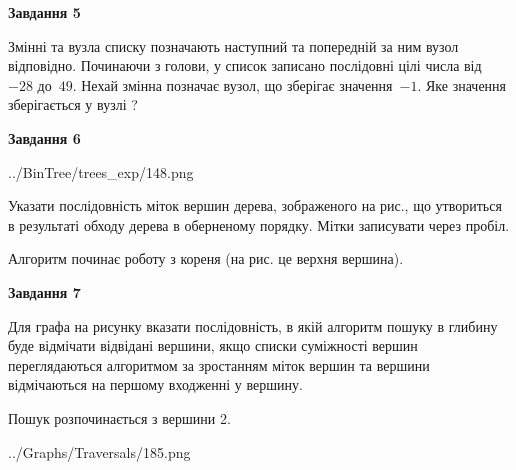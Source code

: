 \documentclass[12pt, ukrainian]{article}
\begin{document}
{\begin {large}
{\begin {center}\textbf{Завдання 5}\end {center}}\par
Змінні  та  вузла списку позначають наступний та попередній за ним вузол відповідно. Починаючи з голови, у список записано послідовні цілі числа від~$-28$ до~$49$. Нехай змінна  позначає вузол, що зберігає значення~$-1$.
Яке значення зберігається у вузлі  ?\par
\newpage

{\begin {center}\textbf{Завдання 6}\end {center}}\par

\begin{center}
	{../BinTree/trees_exp/148.png}
\end{center}
Указати послідовність міток вершин дерева, зображеного на рис., що утвориться в результаті обходу дерева в оберненому порядку. Мітки записувати через пробіл.\par Алгоритм починає роботу з кореня (на рис. це верхня вершина).\par
\newpage

{\begin {center}\textbf{Завдання 7}\end {center}}\par
Для графа на рисунку вказати послідовність, в якій алгоритм пошуку в глибину буде відмічати відвідані вершини, якщо списки суміжності вершин переглядаються алгоритмом за зростанням міток вершин та вершини відмічаються на першому вход\-женні у вершину.\par
Пошук розпочинається з вершини 2.\par

\begin{center}
	{../Graphs/Traversals/185.png}
\end{center}\par
\newpage


\end{large}}
\end{document}
